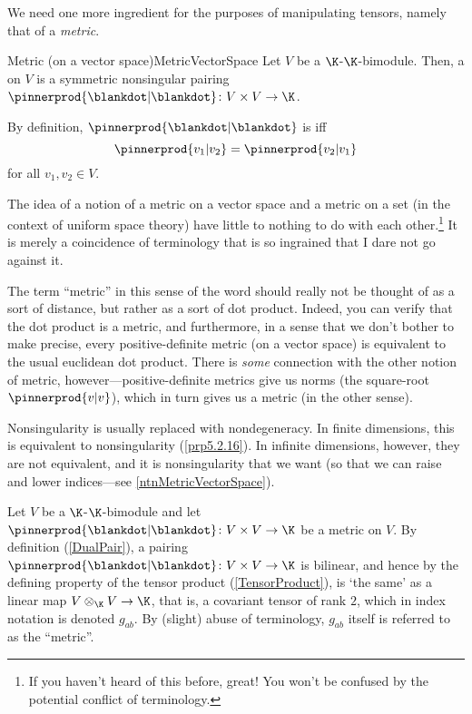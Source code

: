 We need one more ingredient for the purposes of manipulating tensors, namely that of a \emph{metric}.
\begin{dfn}{Metric (on a vector space)}{MetricVectorSpace}
	Let $V$ be a $\K$-$\K$-bimodule.  Then, a  on $V$ is a symmetric nonsingular pairing $\pinnerprod{\blankdot |\blankdot}\colon V\times V\rightarrow \K$.
	\begin{rmk}
		By definition, $\pinnerprod{\blankdot |\blankdot}$ is  iff
		\begin{equation}
			\pinnerprod{v_1|v_2}=\pinnerprod{v_2|v_1}
		\end{equation}
		for all $v_1,v_2\in V$.
	\end{rmk}
	\begin{rmk}
		The idea of a notion of a metric on a vector space and a metric on a set (in the context of uniform space theory) have little to nothing to do with each other.\footnote{If you haven't heard of this before, great!  You won't be confused by the potential conflict of terminology.}  It is merely a coincidence of terminology that is so ingrained that I dare not go against it.
		
		The term ``metric'' in this sense of the word should really not be thought of as a sort of distance, but rather as a sort of dot product.  Indeed, you can verify that the dot product is a metric, and furthermore, in a sense that we don't bother to make precise, every positive-definite metric (on a vector space) is equivalent to the usual euclidean dot product.  There is \emph{some} connection with the other notion of metric, however---positive-definite metrics give us norms (the square-root $\pinnerprod{v|v}$), which in turn gives us a metric (in the other sense).
	\end{rmk}
	\begin{rmk}
		Nonsingularity is usually replaced with nondegeneracy.  In finite dimensions, this is equivalent to nonsingularity (\cref{prp5.2.16}).  In infinite dimensions, however, they are not equivalent, and it is nonsingularity that we want (so that we can raise and lower indices---see \cref{ntnMetricVectorSpace}).
	\end{rmk}
\end{dfn}
Let $V$ be a᪞$\K$-$\K$-bimodule and let $\pinnerprod{\blankdot |\blankdot}\colon V\times V\rightarrow \K$ be a metric on $V$.  By definition (\cref{DualPair}), a pairing $\pinnerprod{\blankdot |\blankdot}\colon V\times V\rightarrow \K$ is bilinear, and hence by the defining property of the tensor product (\cref{TensorProduct}), is `the same' as a linear map $V\otimes _{\K}V\rightarrow \K$, that is, a covariant tensor of rank $2$, which in index  notation is denoted $g_{ab}$.  By (slight) abuse of terminology, $g_{ab}$ itself is referred to as the ``metric''. 
